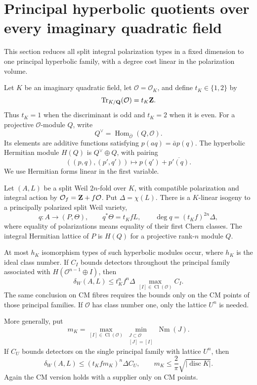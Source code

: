 \section{Principal hyperbolic quotients over every imaginary quadratic field}
\label{sec:principal-quotients}
This section reduces all split integral polarization types in a fixed dimension to one principal hyperbolic family, with a degree cost linear in the polarization volume.

Let $K$ be an imaginary quadratic field, let $\mathcal O=\mathcal O_K$, and define $t_K\in\{1,2\}$ by
\[
 \operatorname{Tr}_{K/\mathbf Q}(\mathcal O)=t_K\mathbf Z.
\]
Thus $t_K=1$ when the discriminant is odd and $t_K=2$ when it is even. For a projective $\mathcal O$-module $Q$, write
\[
 Q^\vee=\operatorname{Hom}_{\bar{\mathcal O}}(Q,\mathcal O).
\]
Its elements are additive functions satisfying $p(aq)=\bar a p(q)$. The hyperbolic Hermitian module $H(Q)$ is $Q^\vee\oplus Q$, with pairing
\[
 ((p,q),(p',q'))\longmapsto p(q')+\overline{p'(q)}.
\]
We use Hermitian forms linear in the first variable.

\begin{theorem}\label{thm:principal-quotient}
Let $(A,L)$ be a split Weil $2n$-fold over $K$, with compatible polarization and integral action by $\mathcal O_f=\mathbf Z+f\mathcal O$. Put $\Delta=\chi(L)$. There is a $K$-linear isogeny to a principally polarized split Weil variety,
\[
 q:A\longrightarrow(P,\Theta),\qquad
 q^*\Theta=t_K fL,\qquad
 \deg q=(t_K f)^{2n}\Delta,
\]
where equality of polarizations means equality of their first Chern classes. The integral Hermitian lattice of $P$ is $H(Q)$ for a projective rank-$n$ module $Q$.

At most $h_K$ isomorphism types of such hyperbolic modules occur, where $h_K$ is the ideal class number. If $C_I$ bounds detectors throughout the principal family associated with $H(\mathcal O^{n-1}\oplus I)$, then
\[
 \delta_W(A,L)\le t_K^n f^n\Delta\,
       \max_{[I]\in\operatorname{Cl}(\mathcal O)} C_I.
\]
The same conclusion on CM fibres requires the bounds only on the CM points of those principal families. If $\mathcal O$ has class number one, only the lattice $U^n$ is needed.

More generally, put
\[
 m_K=\max_{[I]\in\operatorname{Cl}(\mathcal O)}
       \min_{\substack{J\subset\mathcal O\\{[J]=[I]}}}
                    \operatorname{Nm}(J).
\]
If $C_U$ bounds detectors on the single principal family with lattice $U^n$, then
\[
 \delta_W(A,L)\le(t_Kfm_K)^n\Delta C_U,
 \qquad m_K\le\frac2\pi\sqrt{|\operatorname{disc}K|}.
\]
Again the CM version holds with a supplier only on CM points.
\end{theorem}

